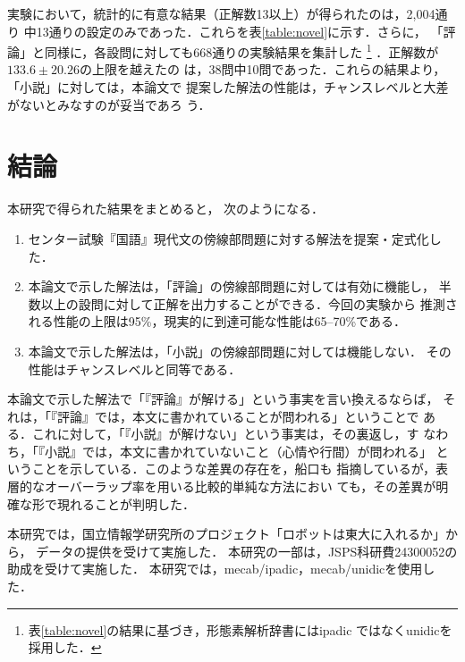 \documentclass[japanese]{jnlp_1.4}
\begin{document}
実験において，統計的に有意な結果（正解数13以上）が得られたのは，2,004通り
中13通りの設定のみであった．これらを表\ref{table:novel}に示す．さらに，
「評論」と同様に，各設問に対しても668通りの実験結果を集計した
\footnote{ 表\ref{table:novel}の結果に基づき，形態素解析辞書にはipadic
ではなくunidicを採用した．} ．正解数が$133.6\pm 20.26$の上限を越えたの
は，38問中10問であった．これらの結果より，「小説」に対しては，本論文で
提案した解法の性能は，チャンスレベルと大差がないとみなすのが妥当であろ
う．


\section{結論}

本研究で得られた結果をまとめると，
次のようになる．
\begin{enumerate}
\item 
センター試験『国語』現代文の傍線部問題に対する解法を提案・定式化した．
\item 
本論文で示した解法は，「評論」の傍線部問題に対しては有効に機能し，
半数以上の設問に対して正解を出力することができる．今回の実験から
推測される性能の上限は95\%，現実的に到達可能な性能は65--70\%である．
\item 
本論文で示した解法は，「小説」の傍線部問題に対しては機能しない．
その性能はチャンスレベルと同等である．
\end{enumerate}

本論文で示した解法で「『評論』が解ける」という事実を言い換えるならば，
それは，「『評論』では，本文に書かれていることが問われる」ということで
ある．これに対して，「『小説』が解けない」という事実は，その裏返し，す
なわち，「『小説』では，本文に書かれていないこと（心情や行間）が問われる」
ということを示している．このような差異の存在を，船口\cite{Funaguchi}も
指摘しているが，表層的なオーバーラップ率を用いる比較的単純な方法におい
ても，その差異が明確な形で現れることが判明した．


\acknowledgment
 
本研究では，国立情報学研究所のプロジェクト「ロボットは東大に入れるか」から，
データの提供を受けて実施した．
本研究の一部は，JSPS科研費24300052の助成を受けて実施した．
本研究では，mecab/ipadic，mecab/unidicを使用した．
\end{document}
